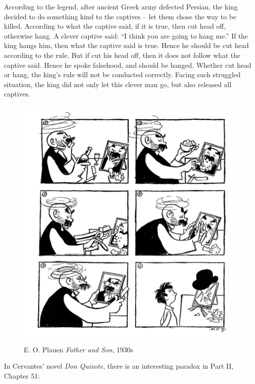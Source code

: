 \documentclass{article}
\begin{document}
According to the legend, after ancient Greek army defected Persian, the king decided to do something kind to the captives -- let them chose the way to be killed. According to what the captive said, if it is true, then cut head off, otherwise hang. A clever captive said: ``I think you are going to hang me.'' If the king hangs him, then what the captive said is true. Hence he should be cut head according to the rule. But if cut his head off, then it does not follow what the captive said. Hence he spoke falsehood, and should be hanged. Whether cut head or hang, the king's rule will not be conducted correctly. Facing such struggled situation, the king did not only let this clever man go, but also released all captives.

\begin{figure}
 \centering
 \includegraphics[scale=0.17]{img/father-and-son.png}
 \captionsetup{labelformat=empty}
 \caption{E. O. Plauen {\em Father and Son}, 1930s}
 \label{fig:father-and-son}
\end{figure}

In Cervantes' novel {\em Don Quixote}, there is an interesting paradox in Part II, Chapter 51:
\end{document}
